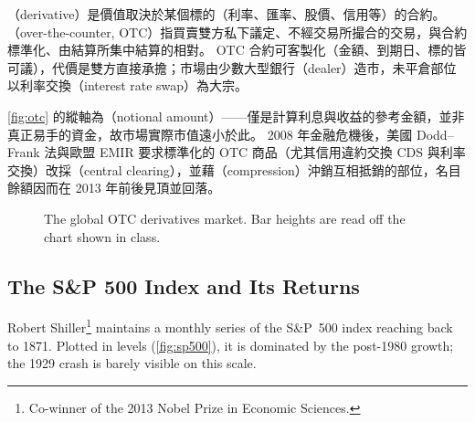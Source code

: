 \suppstart
\begin{remark}
	（derivative）是價值取決於某個標的（利率、匯率、股價、信用等）的合約。
	（over-the-counter, OTC）指買賣雙方私下議定、不經交易所撮合的交易，與合約標準化、由結算所集中結算的相對。
	OTC 合約可客製化（金額、到期日、標的皆可議），代價是雙方直接承擔；市場由少數大型銀行（dealer）造市，未平倉部位以利率交換（interest rate swap）為大宗。

	\autoref{fig:otc} 的縱軸為（notional amount）——僅是計算利息與收益的參考金額，並非真正易手的資金，故市場實際市值遠小於此。
	2008 年金融危機後，美國 Dodd--Frank 法與歐盟 EMIR 要求標準化的 OTC 商品（尤其信用違約交換 CDS 與利率交換）改採（central clearing），並藉（compression）沖銷互相抵銷的部位，名目餘額因而在 2013 年前後見頂並回落。
\end{remark}
\suppend

\begin{figure}[H]
	\centering
	\caption{The global OTC derivatives market. Bar heights are read off the
		chart shown in class.}
	\label{fig:otc}
\end{figure}

\subsection{The S\&P 500 Index and Its Returns}
\label{sec:log-returns}


Robert Shiller\footnote{Co-winner of the 2013 Nobel Prize in Economic Sciences.} maintains a monthly series of the S\&P~500 index reaching back to 1871.
Plotted in levels (\autoref{fig:sp500}), it is dominated by the post-1980 growth; the 1929 crash is barely visible on this scale.

